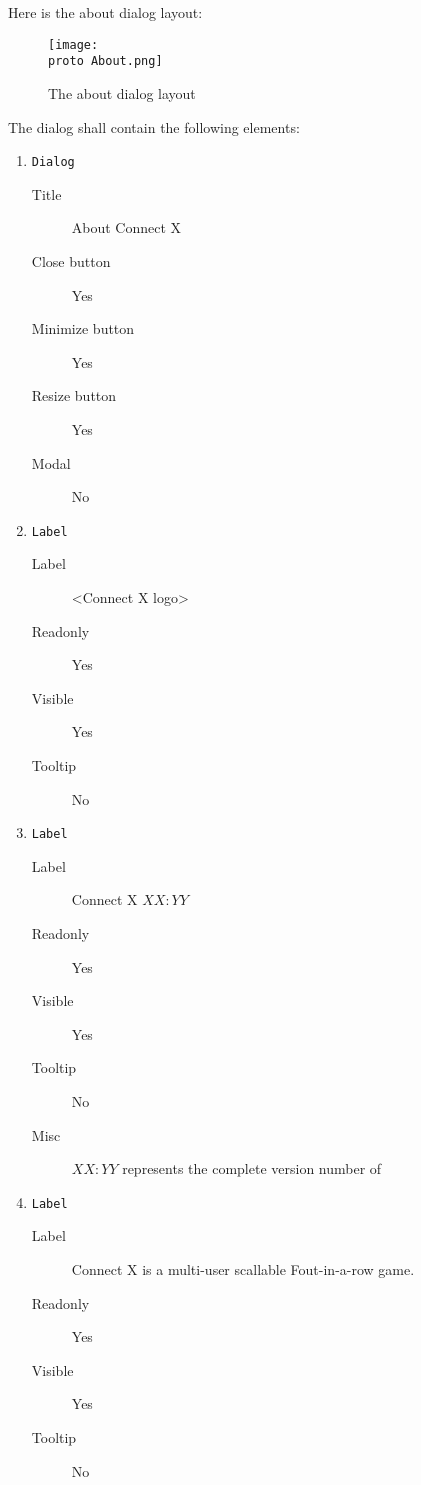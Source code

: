 Here is the about dialog layout:

\begin{figure}[H]
  \texttt{[image: \\proto About.png]}
  \caption{The about dialog layout}
  \label{fig:AboutCXDlgLayout}
\end{figure}

The dialog shall contain the following elements:

\begin{enumerate}

    \item \texttt{Dialog}
              \begin{description}
                  \item[Title] About Connect X
                  \item[Close button] Yes
                  \item[Minimize button] Yes
                  \item[Resize button] Yes
                  \item[Modal] No
              \end{description}

    \item \texttt{Label}
              \begin{description}
                  \item[Label] <Connect X logo>
                  \item[Readonly] Yes
                  \item[Visible] Yes
                  \item[Tooltip] No
              \end{description}

    \item \texttt{Label}
              \begin{description}
                  \item[Label] Connect X $XX:YY$
                  \item[Readonly] Yes
                  \item[Visible] Yes
                  \item[Tooltip] No
                  \item[Misc] $XX:YY$ represents the complete version number of
              \end{description}

    \item \texttt{Label}
              \begin{description}
                  \item[Label] Connect X is a multi-user scallable Fout-in-a-row
                               game.
                  \item[Readonly] Yes
                  \item[Visible] Yes
                  \item[Tooltip] No
              \end{description}


\end{enumerate}
